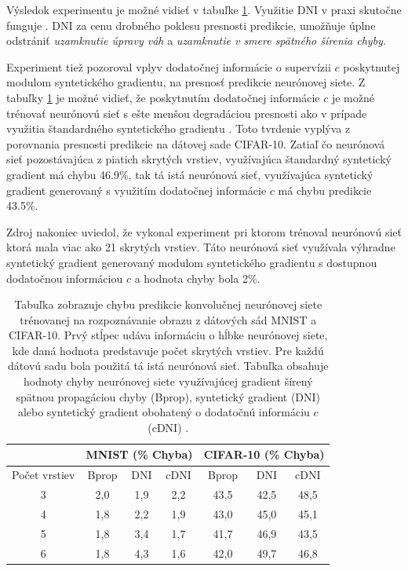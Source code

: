 Výsledok experimentu je možné vidieť v tabuľke \ref{compareDNIandCDNI}. Využitie DNI v praxi skutočne funguje \cite{Jaderberg2016}. DNI za cenu drobného poklesu presnosti predikcie, umožňuje úplne odstrániť \textit{uzamknutie úpravy váh} a \textit{uzamknutie v smere spätného šírenia chyby}. 

Experiment tiež pozoroval vplyv dodatočnej informácie o supervízii $c$ poskytnutej modulom syntetického gradientu, na presnosť predikcie neurónovej siete. Z tabuľky \ref{compareDNIandCDNI} je možné vidieť, že poskytnutím dodatočnej informácie $c$ je možné trénovať neurónovú sieť s ešte menšou degradáciou presnosti ako v prípade využitia štandardného syntetického gradientu \cite{Jaderberg2016}. Toto tvrdenie vyplýva z porovnania presnosti predikcie na dátovej sade CIFAR-10. Zatiaľ čo neurónová sieť pozostávajúca z piatich skrytých vrstiev, využívajúca štandardný syntetický gradient má chybu 46.9\%, tak tá istá neurónová sieť, využívajúca syntetický gradient generovaný s využitím dodatočnej informácie $c$ má chybu predikcie 43.5\%. 

Zdroj \cite{Jaderberg2016} nakoniec uviedol, že vykonal experiment pri ktorom trénoval neurónovú sieť ktorá mala viac ako 21 skrytých vrstiev. Táto neurónová sieť využívala výhradne syntetický gradient generovaný modulom syntetického gradientu s dostupnou dodatočnou informáciou $c$ a hodnota chyby bola 2\%.

\begin{table}
\caption[Porovnanie chyby neurónovej siete trénovanej rôznymi typmi gradientu]{Tabuľka zobrazuje chybu predikcie konvolučnej neurónovej siete trénovanej na rozpoznávanie obrazu z dátových sád MNIST a CIFAR-10. Prvý stĺpec udáva informáciu o hĺbke neurónovej siete, kde daná hodnota predstavuje počet skrytých vrstiev. Pre každú dátovú sadu bola použitá tá istá neurónová sieť. Tabuľka obsahuje hodnoty chyby neurónovej siete využívajúcej gradient šírený spätnou propagáciou chyby (Bprop), syntetický gradient (DNI) alebo syntetický gradient obohatený o dodatočnú informáciu $c$ (cDNI) \cite{Jaderberg2016}.}
\label{compareDNIandCDNI}
\begin{center}
\begin{tabular}{cc|ccc|ccc}
\toprule
      &       & \multicolumn{3}{c|}{MNIST (\% Chyba)} & \multicolumn{3}{c}{CIFAR-10 (\% Chyba)} \\
\midrule
\multicolumn{2}{c|}{Počet vrstiev} & Bprop & DNI  & cDNI  & Bprop & DNI & cDNI \\ \hline
\hline
\multicolumn{2}{c|}{3} & 2,0 & 1,9 & 2,2 & 43,5 & 42,5 & 48,5 \\
\multicolumn{2}{c|}{4} & 1,8 & 2,2 & 1,9 & 43,0 & 45,0 & 45,1 \\
\multicolumn{2}{c|}{5} & 1,8 & 3,4 & 1,7 & 41,7 & 46,9 & 43,5 \\
\multicolumn{2}{c|}{6} & 1,8 & 4,3 & 1,6 & 42,0 & 49,7 & 46,8 \\
\hline
\bottomrule
\end{tabular}%
\end{center}
\end{table}

